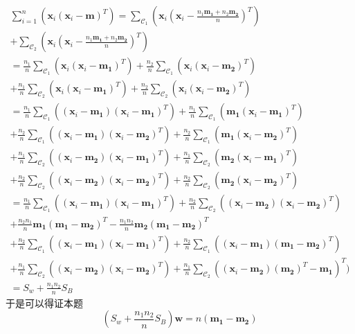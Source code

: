 \documentclass[UTF8,a4paper]{ctexart}
\begin{document}
\begin{equation}\begin{aligned}
\sum_{i=1}^n(\mathbf{x}_i(\mathbf{x}_i-\mathbf{m})^T)=
\sum_{\mathcal{C}_1}(\mathbf{x}_i(\mathbf{x}_i-\frac{n_1\mathbf{m_1}+n_2\mathbf{m_2}}{n})^T)\\
+\sum_{\mathcal{C}_2}(\mathbf{x}_i(\mathbf{x}_i-\frac{n_1\mathbf{m_1}+n_2\mathbf{m_2}}{n})^T)\\
=	\frac{n_1}{n}\sum_{\mathcal{C}_1}(\mathbf{x}_i(\mathbf{x}_i-\mathbf{m_1})^T)
  	+\frac{n_2}{n}\sum_{\mathcal{C}_1}(\mathbf{x}_i(\mathbf{x}_i-\mathbf{m_2})^T)\\
	+\frac{n_1}{n}\sum_{\mathcal{C}_2}(\mathbf{x}_i(\mathbf{x}_i-\mathbf{m_1})^T)
  	+\frac{n_2}{n}\sum_{\mathcal{C}_2}(\mathbf{x}_i(\mathbf{x}_i-\mathbf{m_2})^T)\\
=	\frac{n_1}{n}\sum_{\mathcal{C}_1}((\mathbf{x}_i-\mathbf{m_1})(\mathbf{x}_i-\mathbf{m_1})^T)
	+\frac{n_1}{n}\sum_{\mathcal{C}_1}(\mathbf{m_1}(\mathbf{x}_i-\mathbf{m_1})^T)\\
	+\frac{n_2}{n}\sum_{\mathcal{C}_1}((\mathbf{x}_i-\mathbf{m_1})(\mathbf{x}_i-\mathbf{m_2})^T)
	+\frac{n_2}{n}\sum_{\mathcal{C}_1}(\mathbf{m_1}(\mathbf{x}_i-\mathbf{m_2})^T)\\
	+\frac{n_1}{n}\sum_{\mathcal{C}_2}((\mathbf{x}_i-\mathbf{m_2})(\mathbf{x}_i-\mathbf{m_1})^T)
	+\frac{n_1}{n}\sum_{\mathcal{C}_2}(\mathbf{m_2}(\mathbf{x}_i-\mathbf{m_1})^T)\\
	+\frac{n_2}{n}\sum_{\mathcal{C}_2}((\mathbf{x}_i-\mathbf{m_2})(\mathbf{x}_i-\mathbf{m_2})^T)
	+\frac{n_2}{n}\sum_{\mathcal{C}_2}(\mathbf{m_2}(\mathbf{x}_i-\mathbf{m_2})^T)\\
=	\frac{n_1}{n}\sum_{\mathcal{C}_1}((\mathbf{x}_i-\mathbf{m_1})(\mathbf{x}_i-\mathbf{m_1})^T)
	+\frac{n_2}{n}\sum_{\mathcal{C}_2}((\mathbf{x}_i-\mathbf{m_2})(\mathbf{x}_i-\mathbf{m_2})^T)\\
	+\frac{n_2n_1}{n}\mathbf{m_1}(\mathbf{m_1}-\mathbf{m_2})^T
	-\frac{n_1n_2}{n}\mathbf{m_2}(\mathbf{m_1}-\mathbf{m_2})^T\\
	+\frac{n_2}{n}\sum_{\mathcal{C}_1}((\mathbf{x}_i-\mathbf{m_1})(\mathbf{x}_i-\mathbf{m_1})^T)
	+\frac{n_2}{n}\sum_{\mathcal{C}_1}((\mathbf{x}_i-\mathbf{m_1})(\mathbf{m_1}-\mathbf{m_2})^T)\\
	+\frac{n_1}{n}\sum_{\mathcal{C}_2}((\mathbf{x}_i-\mathbf{m_2})(\mathbf{x}_i-\mathbf{m_2})^T)
	+\frac{n_1}{n}\sum_{\mathcal{C}_2}((\mathbf{x}_i-\mathbf{m_2})(\mathbf{m_2})^T-\mathbf{m_1})^T)\\
=	S_w+\frac{n_1n_2}{n}S_B
\label{le}
\end{aligned}\end{equation}
于是可以得证本题
\begin{equation}
(S_w+\frac{n_1n_2}{n}S_B)\mathbf{w}=n(\mathbf{m_1-m_2})
\label{q2}
\end{equation}
\end{document}

